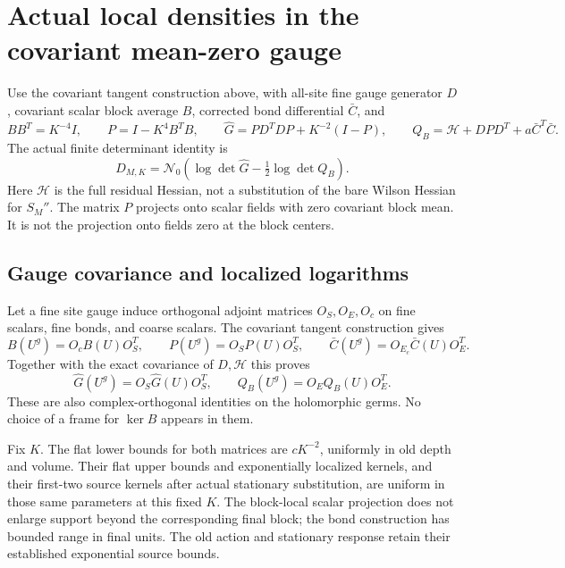\section{Actual local densities in the covariant mean-zero gauge}
\label{cgd-section}

Use the covariant tangent construction above, with all-site
fine gauge generator \(D\), covariant scalar block average
\(B\), corrected bond differential \(\bar C\), and
\[
 BB^T=K^{-4}I,\qquad
 P=I-K^4B^TB,\qquad
 \widehat G=P D^TD P+K^{-2}(I-P),\qquad
 Q_B=\mathcal H+D P D^T+a\bar C^T\bar C.
\]
The actual finite determinant identity is
\begin{equation}
 D_{M,K}=\mathcal N_0
       \left(\log\det\widehat G-\tfrac12\log\det Q_B\right).
 \label{cgd-identity}
\end{equation}
Here \(\mathcal H\) is the full residual Hessian, not a
substitution of the bare Wilson Hessian for \(S_M''\).
The matrix \(P\) projects onto scalar fields with zero
covariant block mean. It is not the projection onto
fields zero at the block centers.

\subsection{Gauge covariance and localized logarithms}
\label{cgd-covariance-section}

Let a fine site gauge induce orthogonal adjoint matrices
\(O_S,O_E,O_c\) on fine scalars, fine bonds, and coarse
scalars. The covariant tangent construction gives
\[
 B(U^g)=O_c B(U)O_S^T,\qquad
 P(U^g)=O_S P(U)O_S^T,\qquad
 \bar C(U^g)=O_{E_c}\bar C(U)O_E^T.
\]
Together with the exact covariance of \(D,\mathcal H\)
this proves
\begin{equation}
 \widehat G(U^g)=O_S\widehat G(U)O_S^T,\qquad
 Q_B(U^g)=O_EQ_B(U)O_E^T.
 \label{cgd-covariance}
\end{equation}
These are also complex-orthogonal identities on the
holomorphic germs. No choice of a frame for \(\ker B\)
appears in them.

Fix \(K\). The flat lower bounds for both matrices are
\(cK^{-2}\), uniformly in old depth and volume. Their
flat upper bounds and exponentially localized kernels,
and their first-two source kernels after actual
stationary substitution, are uniform in those same
parameters at this fixed \(K\).
The block-local scalar projection does not enlarge
support beyond the corresponding final block; the
bond construction has bounded range in final units.
The old action and stationary response retain their
established exponential source bounds.

